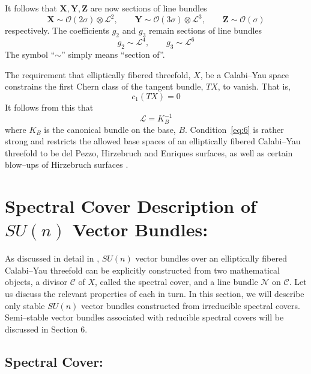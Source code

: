 \documentclass[a4paper,12pt]{article}
\numberwithin{equation}{section}
\newcommand{\bX}{{\mathbf X}}
\newcommand{\bY}{{\mathbf Y}}
\newcommand{\bZ}{{\mathbf Z}}
\def\cC{{\mathcal C}}
\def\cL{{\mathcal L}}
\def\cN{{\mathcal N}}
\def\cO{{\mathcal O}}
\theoremstyle{plain}
\begin{document}
It follows that $\bX,\bY,\bZ$ are now sections of line bundles
\begin{equation}
\bX \sim \cO(2\sigma)\otimes\cL^2 , \qquad
\bY \sim \cO(3\sigma)\otimes \cL^3 , \qquad
\bZ \sim \cO(\sigma)
\label{eq:3}
\end{equation}
respectively. The coefficients $g_2$ and $g_3$ remain 
sections of line bundles
\begin{equation}
g_2 \sim \cL^4, \qquad 
g_3 \sim \cL^6
\label{eq:4}
\end{equation}
The symbol ``$\sim$'' simply means ``section of''.


The requirement that elliptically fibered threefold, $X$, be a
Calabi--Yau space 
constrains the first Chern class of the tangent bundle, $TX$, to
vanish. That is, 
\begin{equation}
c_1(TX)=0
\label{eq:5}
\end{equation}
It follows from this that 
\begin{equation}
\cL=K_B^{-1}
\label{eq:6}
\end{equation}
where $K_B$ is the canonical bundle on the base, $B$. 
Condition~\eqref{eq:6} is
rather strong and restricts the allowed base spaces of an elliptically
fibered Calabi--Yau threefold to be del Pezzo, Hirzebruch and Enriques
surfaces, as well as certain blow--ups of Hirzebruch 
surfaces \cite{Grassi, MoVa} .


\section{Spectral Cover Description of $SU(n)$ Vector Bundles:}


As discussed in detail in \cite{FMW, don2},  $SU(n)$ vector 
bundles over an elliptically
fibered Calabi--Yau threefold can be explicitly constructed from two
mathematical objects, a divisor $\cC$ of $X$, called the spectral cover, and a
line bundle $\cN$ on $\cC$. Let us discuss the relevant properties of each in
turn. In this section, we will describe only stable $SU(n)$ vector bundles
constructed from irreducible spectral covers. Semi--stable vector bundles
associated with reducible spectral covers will be discussed in Section 6.

\subsection*{Spectral Cover:}
\end{document}
